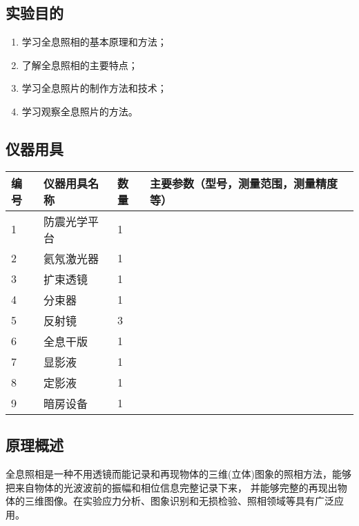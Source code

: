 \documentclass[dvipsnames, svgnames,a4paper,11pt]{article}
\begin{document}
\subsection{实验目的}
	\begin{enumerate}
		\item 学习全息照相的基本原理和方法；
		\item 了解全息照相的主要特点；
		\item 学习全息照片的制作方法和技术；
		\item 学习观察全息照片的方法。
		
		
	\end{enumerate}

\subsection{仪器用具}
\begin{table}[htbp]
	\centering
	\renewcommand\arraystretch{1.6}
	\begin{tabular}{p{}|p{}|p{}|p{}}
	\hline
	编号& 仪器用具名称 & 数量 &  主要参数（型号，测量范围，测量精度等） \\
	\hline
	1  & 防震光学平台 & 1  & ~  \\
	2  & 氦氖激光器  & 1  & ~  \\
	3  & 扩束透镜   & 1  & ~  \\
	4  & 分束器    & 1  & ~  \\
	5  & 反射镜    & 3  & ~  \\
	6  & 全息干版   & 1  & ~  \\
	7  & 显影液    & 1  & ~  \\
	8  & 定影液    & 1  & ~  \\
	9  & 暗房设备   & 1  & ~  \\
	\hline
\end{tabular}
\end{table}

\subsection{原理概述}
	
	全息照相是一种不用透镜而能记录和再现物体的三维(立体)图象的照相方法，能够把来自物体的光波波前的振幅和相位信息完整记录下来， 并能够完整的再现出物体的三维图像。在实验应力分析、图象识别和无损检验、照相领域等具有广泛应用。
	
\end{document}
